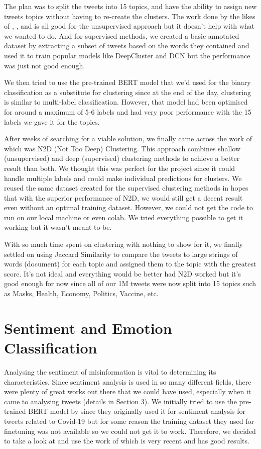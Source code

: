 \documentclass{l4proj}
\begin{document}
The plan was to split the tweets into 15 topics, and have the ability to assign new tweets topics without having to re-create the clusters. The work done by the likes of  \cite{Alnajran2017ClusterAO},  \cite{pksohn}, and  \cite{Sechelea2016TwitterDC} is all good for the unsupervised approach but it doesn't help with what we wanted to do. And for supervised methods, we created a basic annotated dataset by extracting a subset of tweets based on the words they contained and used it to train popular models like DeepCluster and DCN but the performance was just not good enough.

We then tried to use the pre-trained BERT model that we'd used for the binary classification as a substitute for clustering since at the end of the day, clustering is similar to multi-label classification. However, that model had been optimised for around a maximum of 5-6 labels and had very poor performance with the 15 labels we gave it for the topics.

After weeks of searching for a viable solution, we finally came across the work of  \cite{McConville2020} which was N2D (Not Too Deep) Clustering. This approach combines shallow (unsupervised) and deep (supervised) clustering methods to achieve a better result than both. We thought this was perfect for the project since it could handle multiple labels and could make individual predictions for clusters. We reused the same dataset created for the supervised clustering methods in hopes that with the superior performance of N2D, we would still get a decent result even without an optimal training dataset. However, we could not get the code to run on our local machine or even colab. We tried everything possible to get it working but it wasn't meant to be.

With so much time spent on clustering with nothing to show for it, we finally settled on using Jaccard Similarity to compare the tweets to large strings of words (document) for each topic and assigned them to the topic with the greatest score. It's not ideal and everything would be better had N2D worked but it's good enough for now since all of our 1M tweets were now split into 15 topics such as Masks, Health, Economy, Politics, Vaccine, etc.

\section{Sentiment and Emotion Classification}
Analysing the sentiment of misinformation is vital to determining its characteristics. Since sentiment analysis is used in so many different fields, there were plenty of great works out there that we could have used, especially when it came to analysing tweets (details in Section 3). We initially tried to use the pre-trained BERT model by  \cite{muller2020covid} since they originally used it for sentiment analysis for tweets related to Covid-19 but for some reason the training dataset they used for finetuning was not available so we could not get it to work. Therefore, we decided to take a look at and use the work of  \cite{perez2021pysentimiento} which is very recent and has good results.
\end{document}
